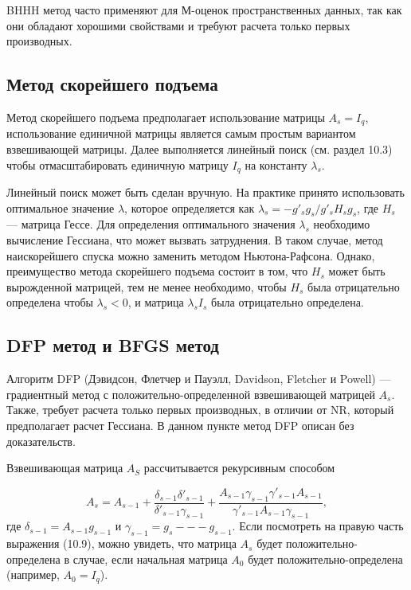 BHHH метод часто применяют для М-оценок пространственных данных, так как они обладают хорошими свойствами и требуют расчета только первых производных.

\subsection{Метод скорейшего подъема}

Метод скорейшего подъема предполагает использование матрицы $A_s = I_q$, использование единичной матрицы является самым простым вариантом взвешивающей матрицы. Далее выполняется линейный поиск (см. раздел 10.3) чтобы отмасштабировать единичную матрицу $I_q$ на константу $\lambda_s$.

Линейный поиск может быть сделан вручную. На практике принято использовать оптимальное значение $\lambda$, которое определяется как $\lambda_s= -g'_s g_s / g'_s H_s g_s$, где $H_s$ --- матрица Гессе. Для определения оптимального значения $\lambda_s$ необходимо вычисление Гессиана, что может вызвать затруднения. В таком случае, метод наискорейшего спуска можно заменить методом Ньютона-Рафсона. Однако, преимущество метода скорейшего подъема состоит в том, что $H_s$ может быть вырожденной матрицей, тем не менее необходимо, чтобы $H_s$ была отрицательно определена чтобы $\lambda_s<0$, и матрица  $\lambda_s I_s$ была отрицательно определена.

\subsection{DFP метод и BFGS метод}

Алгоритм DFP (Дэвидсон, Флетчер и Пауэлл, Davidson, Fletcher и Powell) --- градиентный метод с положительно-определенной взвешивающей матрицей $A_s$. Также, требует расчета только первых производных, в отличии от NR, который предполагает расчет Гессиана. В данном пункте метод DFP описан без доказательств.

Взвешивающая матрица $A_S$ рассчитывается рекурсивным способом

\begin{equation}
A_s = A_{s-1} + \dfrac{\delta_{s-1}\delta'_{s-1}}{\delta'_{s-1}\gamma_{s-1}} + \dfrac{A_{s-1}\gamma_{s-1}\gamma'_{s-1}A_{s-1}}{\gamma'_{s-1}A_{s-1}\gamma_{s-1}},
\end{equation}
где $\delta_{s-1} = A_{s-1}g_{s-1}$ и $\gamma_{s-1} = g_s --- g_{s-1}$. Если посмотреть на правую часть выражения (10.9), можно увидеть, что матрица $A_s$ будет положительно-определена в случае, если начальная матрица $A_0$ будет положительно-определена (например, $A_0 = I_q$).

